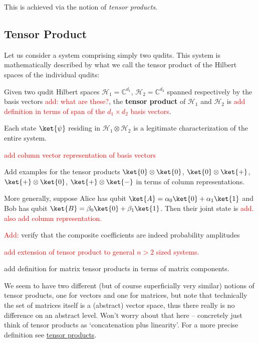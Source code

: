 This is achieved via the notion of \textit{tensor products}.

\subsection{Tensor Product}
Let us consider a system comprising simply two qudits. This system is mathematically described by what we call the tensor product of the Hilbert spaces of the individual qudits:
\begin{definition}
    Given two qudit Hilbert spaces $\mathcal{H}_1 = \mathbb{C}^{d_1}$, $\mathcal{H}_2 = \mathbb{C}^{d_2}$ spanned respectively by the basis vectors \textcolor{red}{add: what are these?}, the \textbf{tensor product} of $\mathcal{H}_1$ and $\mathcal{H}_2$ is \textcolor{red}{add definition in terms of span of the $d_1 \times d_2$ basis vectors}.

    Each state $\ket{\psi}$ residing in $\mathcal{H}_1 \otimes \mathcal{H}_2$ is a legitimate characterization of the entire system.

    \textcolor{red}{add column vector representation of basis vectors}
\end{definition}

\begin{example}
    Add examples for the tensor products $\ket{0} \otimes \ket{0}$, $\ket{0} \otimes \ket{+}$, $\ket{+} \otimes \ket{0}$, $\ket{+} \otimes \ket{-}$ in terms of column representations.

    More generally, suppose Alice has qubit $\ket{A} = \alpha_0\ket{0} + \alpha_1\ket{1}$ and Bob has qubit $\ket{B} = \beta_0\ket{0} + \beta_1\ket{1}$. Then their joint state is \textcolor{red}{add. also add column representation.}

    \textcolor{red}{Add:} verify that the composite coefficients are indeed probability amplitudes
\end{example}

\textcolor{red}{add extension of tensor product to general $n>2$ sized systems.}

\begin{definition}
    add definition for matrix tensor products in terms of matrix components.
\end{definition}

We seem to have two different (but of course superficially very similar) notions of tensor products, one for vectors and one for matrices, but note that technically the set of matrices itself is a (abstract) vector space, thus there really is no difference on an abstract level. Won't worry about that here -- concretely just think of tensor products as `concatenation plus linearity'. For a more precise definition see \href{https://en.wikipedia.org/wiki/Tensor_product}{tensor products}.


